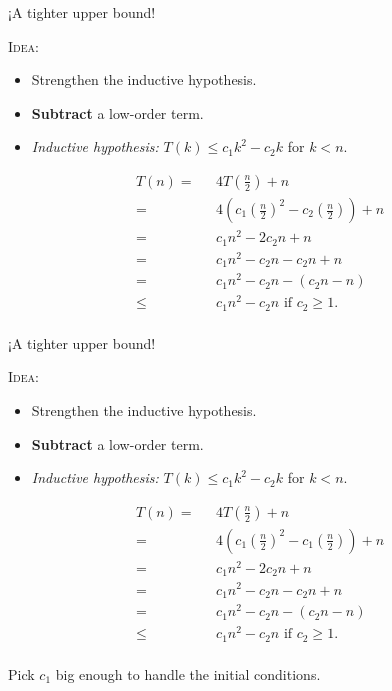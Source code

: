 \documentclass{beamer}
\begin{document}
\begin{frame}{¡A tighter upper bound!}
    \begin{block}{\textsc{Idea}:}
        \begin{itemize}
        \item Strengthen the inductive hypothesis.
         \item \textbf{Subtract} a low-order term.
         \item \textit{Inductive hypothesis:} $T(k) \leq c_1k^2 - c_2k$ for $k < n$.
        \end{itemize}
    \end{block}
    \begin{align*}
        T(n) = & \text{ }4T\left(\frac{n}{2}\right) + n \\
               = & \text{ }4\left(c_1\left(\frac{n}{2}\right)^2 - c_2\left(\frac{n}{2}\right)\right) + n \\
               = & \text{ }c_1n^2 - 2c_2n + n \\
               = & \text{ }c_1n^2 - c_2n - c_2n + n \\
               = & \text{ }c_1n^2 - c_2n - (c_2n - n) \\
               \leq & \text{ }c_1n^2 - c_2n \text{ if } c_2 \geq 1 \text{.} \\
    \end{align*}
\end{frame}

\begin{frame}{¡A tighter upper bound!}
    \begin{block}{\textsc{Idea}:}
        \begin{itemize}
        \item Strengthen the inductive hypothesis.
         \item \textbf{Subtract} a low-order term.
         \item \textit{Inductive hypothesis:} $T(k) \leq c_1k^2 - c_2k$ for $k < n$.
        \end{itemize}
    \end{block}
    \vspace{-5mm}
    \begin{align*}
        T(n) = & \text{ }4T\left(\frac{n}{2}\right) + n \\
               = & \text{ }4\left(c_1\left(\frac{n}{2}\right)^2 - c_1\left(\frac{n}{2}\right)\right) + n \\
               = & \text{ }c_1n^2 - 2c_2n + n \\
               = & \text{ }c_1n^2 - c_2n - c_2n + n \\
               = & \text{ }c_1n^2 - c_2n - (c_2n - n) \\
               \leq & \text{ }c_1n^2 - c_2n \text{ if } c_2 \geq 1 \text{.} \\
    \end{align*}
    \vspace{-15mm}
    \begin{block}{}
        Pick $c_1$ big enough to handle the initial conditions.
    \end{block}
\end{frame}
\end{document}
